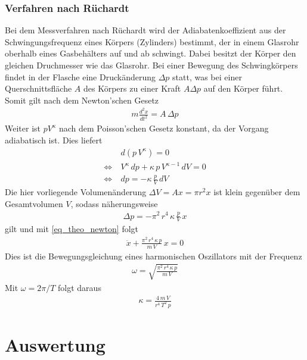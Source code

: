 \documentclass[12pt,a4paper,german]{scrartcl}
\numberwithin{equation}{section}
\begin{document}
  \subsubsection{Verfahren nach Rüchardt}
  Bei dem Messverfahren nach Rüchardt wird der Adiabatenkoeffizient aus der Schwingungsfrequenz eines Körpers (Zylinders) bestimmt, der in einem Glasrohr oberhalb eines Gasbehälters auf und ab schwingt.
  Dabei besitzt der Körper den gleichen Druchmesser wie das Glasrohr.
  Bei einer Bewegung des Schwingkörpers findet in der Flasche eine Druckänderung $\Delta p$ statt, was bei einer Querschnittsfläche $A$ des Körpers zu einer Kraft $A \Delta p$ auf den Körper führt.
  Somit gilt nach dem Newton'schen Gesetz
  \begin{align}
    m \frac{d^2x}{d t^2} = A \, \Delta p
    \label{eq_theo_newton}
  \end{align}
  Weiter ist $p V^\kappa$ nach dem Poisson'schen Gesetz konstant, da der Vorgang adiabatisch ist.
  Dies liefert
  \begin{align}
    &d (p \, V^\kappa) = 0 \nonumber \\
    \Leftrightarrow \ & V^\kappa \, dp + \kappa \, p \, V^{\kappa - 1} \, dV = 0 \nonumber \\
    \Leftrightarrow \ & dp = -\kappa \, \frac{p}{V} \, dV
  \end{align}
  Die hier vorliegende Volumenänderung $\Delta V = A x = \pi r^2 x$ ist klein gegenüber dem Gesamtvolumen $V$, sodass näherungsweise
  \begin{align}
    \Delta p = -\pi^2 \, r^4 \, \kappa \, \frac{p}{V} \, x
  \end{align}
  gilt und mit \ref{eq_theo_newton} folgt
  \begin{align}
    \ddot{x} + \frac{\pi^2 \, r^4 \, \kappa \, p}{m \, V} \, x = 0
  \end{align}
  Dies ist die Bewegungsgleichung eines harmonischen Oszillators mit der Frequenz
  \begin{align}
    \omega = \sqrt{\frac{\pi^2 \, r^4 \, \kappa \, p}{m \, V}}
  \end{align}
  Mit $\omega = 2 \pi / T$ folgt daraus
  \begin{align}
    \kappa = \frac{4 \, m \, V}{r^4 \, T^2 \, p}
    \label{eq_theo_kappa_ruechardt}
  \end{align}
  
  \newpage
  \section{Auswertung}
  
\end{document}
